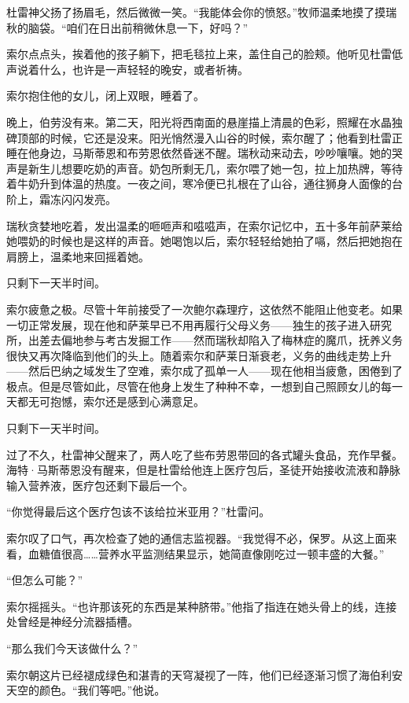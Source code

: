 \documentclass[AutoFakeBold=true]{book}
\begin{document}
杜雷神父扬了扬眉毛，然后微微一笑。``我能体会你的愤怒。''牧师温柔地摸了摸瑞秋的脑袋。``咱们在日出前稍微休息一下，好吗？''

索尔点点头，挨着他的孩子躺下，把毛毯拉上来，盖住自己的脸颊。他听见杜雷低声说着什么，也许是一声轻轻的晚安，或者祈祷。

索尔抱住他的女儿，闭上双眼，睡着了。

\vspace*{1em}

晚上，伯劳没有来。第二天，阳光将西南面的悬崖描上清晨的色彩，照耀在水晶独碑顶部的时候，它还是没来。阳光悄然漫入山谷的时候，索尔醒了；他看到杜雷正睡在他身边，马斯蒂恩和布劳恩依然昏迷不醒。瑞秋动来动去，吵吵嚷嚷。她的哭声是新生儿想要吃奶的声音。奶包所剩无几，索尔喂了她一包，拉上加热牌，等待着牛奶升到体温的热度。一夜之间，寒冷便已扎根在了山谷，通往狮身人面像的台阶上，霜冻闪闪发亮。

瑞秋贪婪地吃着，发出温柔的咂咂声和嗞嗞声，在索尔记忆中，五十多年前萨莱给她喂奶的时候也是这样的声音。她喝饱以后，索尔轻轻给她拍了嗝，然后把她抱在肩膀上，温柔地来回摇着她。

只剩下一天半时间。

索尔疲惫之极。尽管十年前接受了一次鲍尔森理疗，这依然不能阻止他变老。如果一切正常发展，现在他和萨莱早已不用再履行父母义务——独生的孩子进入研究所，出差去偏地参与考古发掘工作——然而瑞秋却陷入了梅林症的魔爪，抚养义务很快又再次降临到他们的头上。随着索尔和萨莱日渐衰老，义务的曲线走势上升——然后巴纳之域发生了空难，索尔成了孤单一人——现在他相当疲惫，困倦到了极点。但是尽管如此，尽管在他身上发生了种种不幸，一想到自己照顾女儿的每一天都无可抱憾，索尔还是感到心满意足。

只剩下一天半时间。

过了不久，杜雷神父醒来了，两人吃了些布劳恩带回的各式罐头食品，充作早餐。海特·马斯蒂恩没有醒来，但是杜雷给他连上医疗包后，圣徒开始接收流液和静脉输入营养液，医疗包还剩下最后一个。

``你觉得最后这个医疗包该不该给拉米亚用？''杜雷问。

索尔叹了口气，再次检查了她的通信志监视器。``我觉得不必，保罗。从这上面来看，血糖值很高……营养水平监测结果显示，她简直像刚吃过一顿丰盛的大餐。''

``但怎么可能？''

索尔摇摇头。``也许那该死的东西是某种脐带。''他指了指连在她头骨上的线，连接处曾经是神经分流器插槽。

``那么我们今天该做什么？''

索尔朝这片已经褪成绿色和湛青的天穹凝视了一阵，他们已经逐渐习惯了海伯利安天空的颜色。``我们等吧。''他说。
\end{document}
